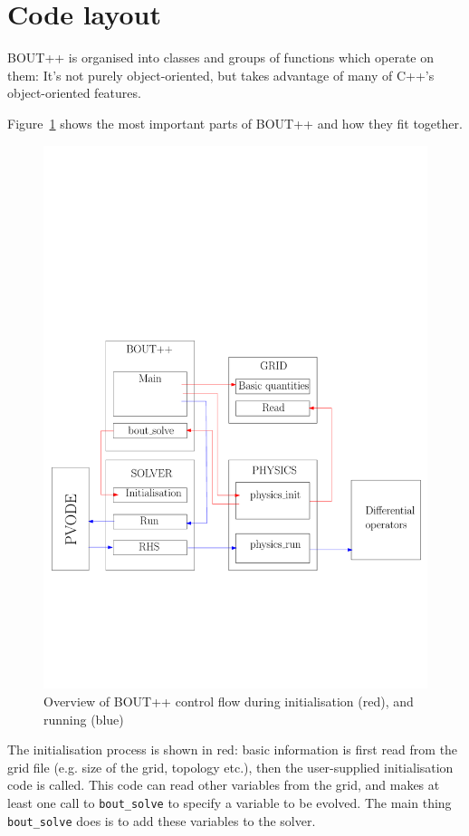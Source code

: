 \documentclass[12pt]{article}
\newcommand{\code}[1]{\texttt{#1}}
\begin{document}
\section{Code layout}

BOUT++ is organised into classes and groups of functions which operate on them: 
It's not purely object-oriented, but takes advantage of many of C++'s object-oriented features. 

Figure~\ref{fig:layout1} shows the most important parts of BOUT++ and how they fit together.
\begin{figure}[htbp!]
\centering
\includegraphics[width=0.7\paperwidth, keepaspectratio]{figs/layout1.pdf}
\caption{Overview of BOUT++ control flow during initialisation (red), and running (blue)}
\label{fig:layout1}
\end{figure}
The initialisation process is shown in red: basic information is first read from the grid
file (e.g. size of the grid, topology etc.), then the user-supplied initialisation
code is called. This code can read other variables from the grid, and makes at least
one call
to \code{bout\_solve} to specify a variable to be evolved. The main thing \code{bout\_solve}
does is to add these variables to the solver. 
\end{document}
